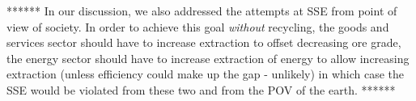 ****** In our discussion, we also addressed the attempts at SSE from point of view of society. In order to achieve this goal \emph{without} recycling, the goods and services sector should have to increase extraction to offset decreasing ore grade, the energy sector should have to increase extraction of energy to allow increasing extraction (unless efficiency could make up the gap - unlikely) in which case the SSE would be violated from these two and from the POV of the earth.
******








%
%


